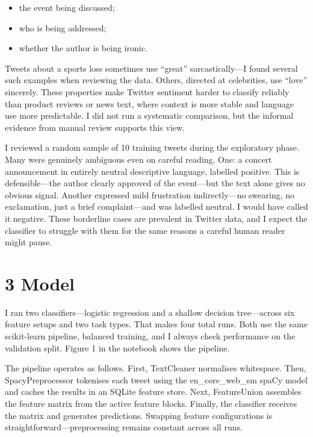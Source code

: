 \documentclass[12pt]{article}
\begin{document}
\begin{itemize}

  \item the event being discussed;

  \item who is being addressed;

  \item whether the author is being ironic.

\end{itemize} Tweets about a sports loss sometimes use ``great'' sarcastically---I found several such examples when reviewing the data. Others, directed at celebrities, use ``love'' sincerely. These properties make Twitter sentiment harder to classify reliably than product reviews or news text, where context is more stable and language use more predictable. I did not run a systematic comparison, but the informal evidence from manual review supports this view.

I reviewed a random sample of 10 training tweets during the exploratory phase. Many were genuinely ambiguous even on careful reading. One: a concert announcement in entirely neutral descriptive language, labelled positive. This is defensible---the author clearly approved of the event---but the text alone gives no obvious signal. Another expressed mild frustration indirectly---no swearing, no exclamation, just a brief complaint---and was labelled neutral. I would have called it negative. These borderline cases are prevalent in Twitter data, and I expect the classifier to struggle with them for the same reasons a careful human reader might pause.



\section*{3 Model}



I ran two classifiers---logistic regression and a shallow decision tree---across six feature setups and two task types. That makes four total runs. Both use the same scikit-learn pipeline, balanced training, and I always check performance on the validation split. Figure 1 in the notebook shows the pipeline.

The pipeline operates as follows. First, TextCleaner normalises whitespace. Then, SpacyPreprocessor tokenises each tweet using the en\_core\_web\_sm spaCy model and caches the results in an SQLite feature store. Next, FeatureUnion assembles the feature matrix from the active feature blocks. Finally, the classifier receives the matrix and generates predictions. Swapping feature configurations is straightforward---preprocessing remains constant across all runs.
\end{document}

